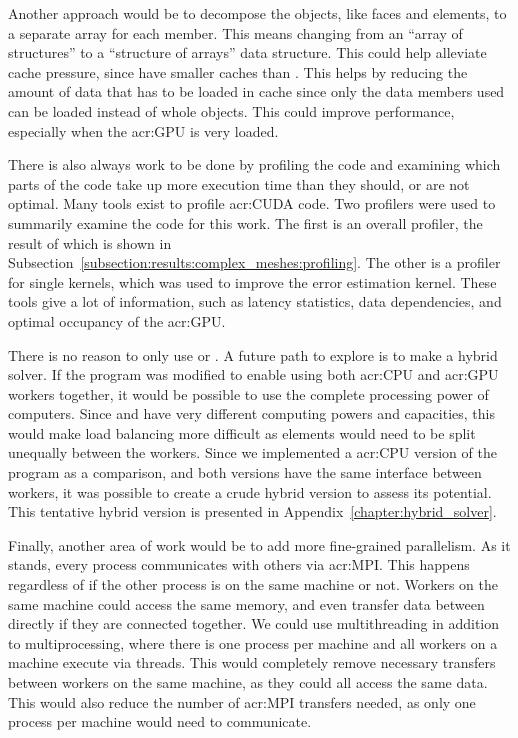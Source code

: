 Another approach would be to decompose the objects, like faces and elements, to a separate array for
each member. This means changing from an ``array of structures'' to a ``structure of arrays'' data
structure. This could help alleviate cache pressure, since  have smaller caches
than . This helps by reducing the amount of data that has to be loaded in cache
since only the data members used can be loaded instead of whole objects. This could improve
performance, especially when the \acrshort{acr:GPU} is very loaded.

There is also always work to be done by profiling the code and examining which parts of the code
take up more execution time than they should, or are not optimal. Many tools exist to profile
\acrshort{acr:CUDA} code. Two profilers were used to summarily examine the code for this work. The
first is an overall profiler, the result of which is shown in
Subsection~\ref{subsection:results:complex_meshes:profiling}. The other is a profiler for single
kernels, which was used to improve the error estimation kernel. These tools give a lot of
information, such as latency statistics, data dependencies, and optimal occupancy of the
\acrshort{acr:GPU}.

There is no reason to only use  or . A future path to
explore is to make a hybrid solver. If the program was modified to enable using both
\acrshort{acr:CPU} and \acrshort{acr:GPU} workers together, it would be possible to use the complete
processing power of computers. Since  and  have very
different computing powers and capacities, this would make load balancing more difficult as elements
would need to be split unequally between the workers. Since we implemented a \acrshort{acr:CPU}
version of the program as a comparison, and both versions have the same interface between workers,
it was possible to create a crude hybrid version to assess its potential. This tentative hybrid
version is presented in Appendix~\ref{chapter:hybrid_solver}.

Finally, another area of work would be to add more fine-grained parallelism. As it stands, every
process communicates with others via \acrshort{acr:MPI}. This happens regardless of if
the other process is on the same machine or not. Workers on the same machine could access the same
memory, and even transfer data between  directly if they are connected together.
We could use multithreading in addition to multiprocessing, where there is one process per machine
and all workers on a machine execute via threads. This would completely remove necessary transfers
between workers on the same machine, as they could all access the same data. This would also reduce
the number of \acrshort{acr:MPI} transfers needed, as only one process per machine would need to
communicate.

